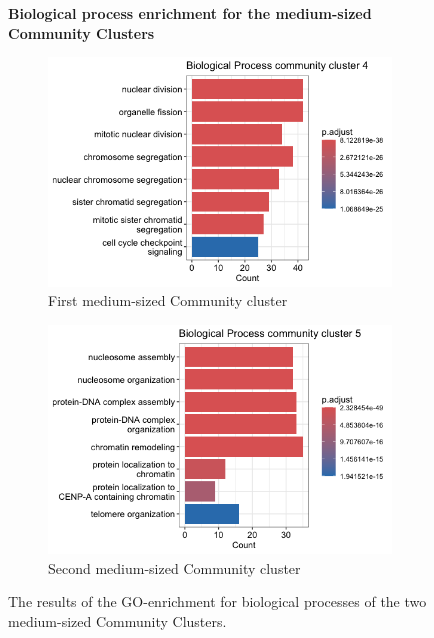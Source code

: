  \begin{figure}[htb]
 	\centering
 	\caption*{\textbf{Biological process enrichment for the medium-sized Community Clusters}}
		\begin{subfigure}{.49\textwidth}
			\centering
 			\includegraphics[width=\textwidth]{fig/Biological Process glay cluster 4.png}
 			\caption{First medium-sized Community cluster}
 		\end{subfigure}
    	\begin{subfigure}{.49\textwidth}
    		\centering
 			\includegraphics[width=\textwidth]{fig/Biological Process glay cluster 5.png}
 			\caption{Second medium-sized Community cluster}
 		\end{subfigure}
 	\caption{The results of the GO-enrichment for biological processes of the two medium-sized Community Clusters.}
 	\label{fig:medium-community-bp}
 \end{figure}
